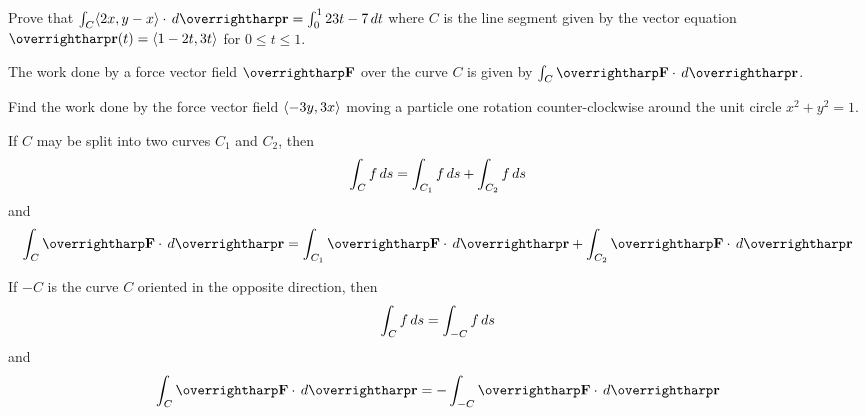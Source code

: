 \documentclass[letterpaper, twoside, 12pt]{book}
\begin{document}
          \begin{problem}
            Prove that
            $\int_C \<2x,y-x\>\cdot\dvar{\vect{r}}
              =
            \int_0^1 23t-7 \dvar{t}$
            where $C$ is the line segment given by the vector equation
            $\vect{r}(t)=\<1-2t,3t\>$ for $0\leq t\leq 1$.
          \end{problem}

          \begin{solution}

          \end{solution}

          \begin{contributors}

          \end{contributors}

\begin{remark}
  The work done by a force vector field $\vect{F}$ over the curve $C$
  is given by $\int_C\vect{F}\cdot\dvar{\vect{r}}$.
\end{remark}

          \begin{problem}
            Find the work done by the force vector field
            $\langle-3y,3x\rangle$ moving a particle one rotation counter-clockwise
            around the unit circle $x^2+y^2=1$.
          \end{problem}

          \begin{solution}

          \end{solution}

          \begin{contributors}

          \end{contributors}

\begin{theorem}
  If $C$ may be split into two curves $C_1$ and $C_2$, then
  \[
    \int_C f\,d{s}
      =
    \int_{C_1} f\,d{s}
      +
    \int_{C_2} f\,d{s}
  \]
  and
  \[
    \int_C \vect F\cdot\dvar{\vect r}
      =
    \int_{C_1} \vect F\cdot\dvar{\vect r}
      +
    \int_{C_2} \vect F\cdot\dvar{\vect r}
  \]
\end{theorem}

\begin{theorem}
  If $-C$ is the curve $C$ oriented in the opposite direction, then
  \[
    \int_C f\,d{s}
      =
    \int_{-C} f\,d{s}
  \]
  and
  \[
    \int_C \vect F\cdot\dvar{\vect r}
      =
    - \int_{-C} \vect F\cdot\dvar{\vect r}
  \]
\end{theorem}
\end{document}
